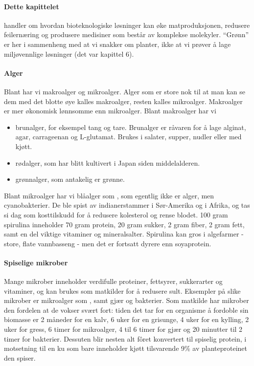 
\paragraph{Dette kapittelet} handler om hvordan bioteknologiske løsninger kan øke matproduksjonen, redusere feilernæring og produsere medisiner som består av komplekse molekyler. ``Grønn'' er her i sammenheng med at vi snakker om planter, ikke at vi prøver å lage miljøvennlige løsninger (det var kapittel 6).


\paragraph{Alger} Blant  har vi makroalger og mikroalger. Alger som er store nok til at man kan se dem med det blotte øye kalles makroalger, resten kalles mikroalger. Makroalger er mer økonomisk lønnsomme enn mikroalger. Blant makroalger har vi
\begin{itemize}[nolistsep,noitemsep]
	\item brunalger, for eksempel tang og tare. Brunalger er råvaren for å lage alginat, agar, carrageenan og L-glutamat. Brukes i salater, supper, nudler eller med kjøtt.
	\item rødalger, som har blitt kultivert i Japan siden middelalderen.
	\item grønnalger, som antakelig er grønne.
\end{itemize}

Blant mikroalger har vi blåalger som , som egentlig ikke er alger, men cyanobakterier. De ble spist av indianerstammer i Sør-Amerika og i Afrika, og tas si dag som kosttilskudd for å redusere kolesterol og rense blodet. 100 gram spirulina inneholder 70 gram protein, 20 gram sukker, 2 gram fiber, 2 gram fett, samt en del viktige vitaminer og mineralsalter. Spirulina kan gros i algefarmer - store, flate vannbasseng - men det er fortsatt dyrere enn soyaprotein.

\paragraph{Spiselige mikrober} Mange mikrober inneholder verdifulle proteiner, fettsyrer, sukkerarter og vitaminer, og kan brukes som matkilder for å redusere sult. Eksempler på slike mikrober er mikroalger som , samt gjær og bakterier. Som matkilde har mikrober den fordelen at de vokser svært fort: tiden det tar for en organisme å fordoble sin biomasse er 2 måneder for en kalv, 6 uker for en grisunge, 4 uker for en kylling, 2 uker for gress, 6 timer for mikroalger, 4 til 6 timer for gjær og 20 minutter til 2 timer for bakterier. Dessuten blir nesten alt fôret konvertert til spiselig protein, i motsetning til en ku som bare inneholder kjøtt tilsvarende 9\% av planteproteinet den spiser.


